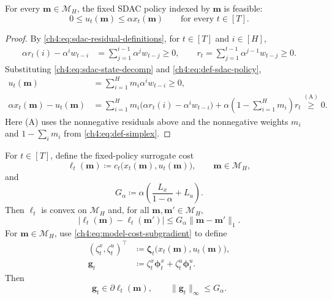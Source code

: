 \begin{Thm:Lemma}
\label{ch4:lem:sdac-feasibility}
For every $\mathbf{m}\in\mathcal{M}_H$, the fixed SDAC policy
indexed by $\mathbf{m}$ is feasible:
\[
0\le u_t(\mathbf{m})\le \alpha x_t(\mathbf{m})
\qquad \text{for every }t\in[T].
\]
\end{Thm:Lemma}

\begin{proof}
By \eqref{ch4:eq:sdac-residual-definitions}, for $t\in[T]$ and $i\in[H]$,
\begin{align*}
 \alpha r_t(i)-\alpha^iw_{t-i}
 &=\sum_{j=1}^{i-1}\alpha^jw_{t-j}\ge0,
 \qquad
 r_t=\sum_{j=1}^{t-1}\alpha^{j-1}w_{t-j}\ge0.
\end{align*}
Substituting \eqref{ch4:eq:sdac-state-decomp} and
\eqref{ch4:eq:def-sdac-policy},
\begin{align*}
u_t(\mathbf m)
 &=\sum_{i=1}^Hm_i\alpha^iw_{t-i}\ge0,\\
\alpha x_t(\mathbf m)-u_t(\mathbf m)
 &=\sum_{i=1}^Hm_i\bigl(\alpha r_t(i)-\alpha^iw_{t-i}\bigr)
   +\alpha\left(1-\sum_{i=1}^Hm_i\right)r_t
\overset{\mathrm{(A)}}{\ge}0.
\end{align*}
Here (A) uses the nonnegative residuals above and the nonnegative weights
$m_i$ and $1-\sum_i m_i$ from \eqref{ch4:eq:def-simplex}.
\end{proof}



\begin{Thm:Lemma}
\label{ch4:lem:sdac-surrogate}
For $t\in[T]$, define the fixed-policy surrogate cost
\begin{equation}
\label{ch4:eq:def-surrogate-cost}
\ell_t(\mathbf{m})
\coloneqq
c_t\bigl(x_t(\mathbf{m}),u_t(\mathbf{m})\bigr),
\qquad
\mathbf{m}\in\mathcal{M}_H,
\end{equation}
and
\begin{equation}
\label{ch4:eq:def-surrogate-G}
G_\alpha
\coloneqq
\alpha\left(\frac{L_x}{1-\alpha}+L_u\right).
\end{equation}
Then $\ell_t$ is convex on $\mathcal{M}_H$ and, for all
$\mathbf{m},\mathbf{m}'\in\mathcal{M}_H$,
\[
|\ell_t(\mathbf{m})-\ell_t(\mathbf{m}')|
\le
G_\alpha\|\mathbf{m}-\mathbf{m}'\|_1.
\]
For $\mathbf{m}\in\mathcal{M}_H$, use \eqref{ch4:eq:model-cost-subgradient} to define
\begin{equation}
\label{ch4:eq:surr-subgradient}
\begin{aligned}
(\zeta_t^x,\zeta_t^u)^\top
&\coloneqq
\boldsymbol{\zeta}_t\bigl(x_t(\mathbf{m}),u_t(\mathbf{m})\bigr), \\
\mathbf{g}_t
&\coloneqq
\zeta_t^x\boldsymbol{\phi}_t^x
+\zeta_t^u\boldsymbol{\phi}_t^u.
\end{aligned}
\end{equation}
Then
\[
\mathbf{g}_t\in\partial\ell_t(\mathbf{m}),
\qquad
\|\mathbf{g}_t\|_\infty\le G_\alpha.
\]
\end{Thm:Lemma}

